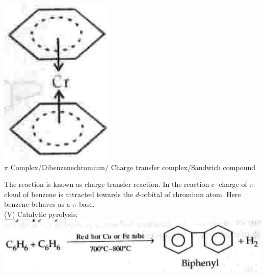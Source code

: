 \documentclass[10pt]{article}
\begin{document}
\includegraphics[max width=\textwidth, center]{2025_01_28_8470952b98110cec3aabg-211(1)}\\
$\pi$ Complex/Dibenzenechromium/ Charge transfer complex/Sandwich compound

The reaction is known as charge transfer reaction. In the reaction $\mathrm{e}^{-}$charge of $\pi$-cloud of benzene is attracted towards the $d$-orbital of chromium atom. Here benzene behaves as a $\pi$-base.\\
(V) Catalytic pyrolysis:\\
\includegraphics[max width=\textwidth, center]{2025_01_28_8470952b98110cec3aabg-211(4)}
\end{document}

